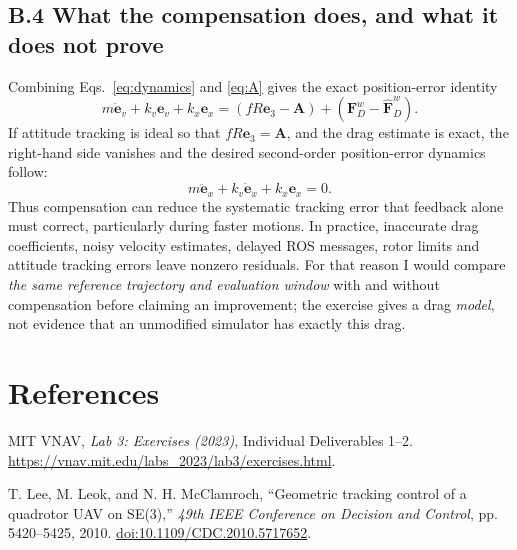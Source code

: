 \documentclass[10pt,a4paper]{article}
\newcommand{\eThree}{\mathbf e_3}
\begin{document}
\subsection*{B.4 What the compensation does, and what it does not prove}

Combining Eqs.~\eqref{eq:dynamics} and \eqref{eq:A} gives the exact position-error identity
\begin{equation}
\boxed{m\dot{\mathbf e}_v+k_v\mathbf e_v+k_x\mathbf e_x
=(fR\eThree-\mathbf A)+(\mathbf F_D^w-\widehat{\mathbf F}_D^w).}
\label{eq:residual}
\end{equation}
If attitude tracking is ideal so that $fR\eThree=\mathbf A$, and the drag estimate is exact, the right-hand side vanishes and the desired second-order position-error dynamics follow:
\begin{equation}
 m\ddot{\mathbf e}_x+k_v\dot{\mathbf e}_x+k_x\mathbf e_x=0.
\label{eq:ideal}
\end{equation}
Thus compensation can reduce the systematic tracking error that feedback alone must correct, particularly during faster motions. In practice, inaccurate drag coefficients, noisy velocity estimates, delayed ROS messages, rotor limits and attitude tracking errors leave nonzero residuals. For that reason I would compare \emph{the same reference trajectory and evaluation window} with and without compensation before claiming an improvement; the exercise gives a drag \emph{model}, not evidence that an unmodified simulator has exactly this drag.

\section*{References}
\begin{enumerate}[leftmargin=1.75em,label={[\arabic*]},itemsep=1pt]
\item MIT VNAV, \emph{Lab 3: Exercises (2023)}, Individual Deliverables 1--2. \url{https://vnav.mit.edu/labs_2023/lab3/exercises.html}.
\item T. Lee, M. Leok, and N. H. McClamroch, ``Geometric tracking control of a quadrotor UAV on SE(3),'' \emph{49th IEEE Conference on Decision and Control}, pp. 5420--5425, 2010. \href{https://doi.org/10.1109/CDC.2010.5717652}{doi:10.1109/CDC.2010.5717652}.
\end{enumerate}
\end{document}
